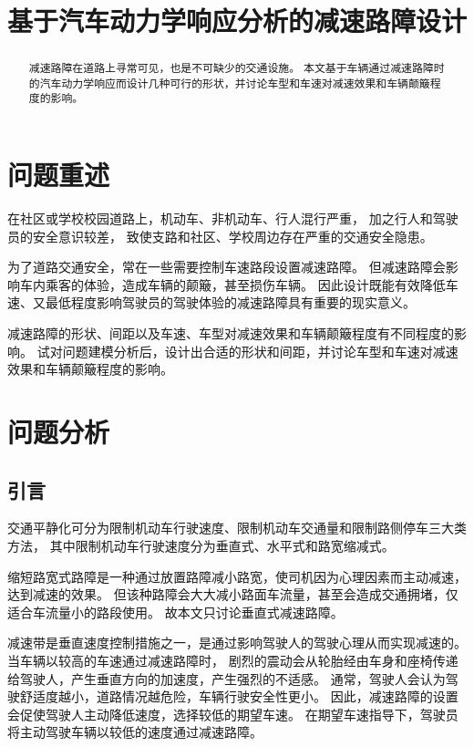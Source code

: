 \documentclass[withoutpreface,bwprint]{cumcmthesis}
\title{基于汽车动力学响应分析的减速路障设计}
\begin{document}
\maketitle
\begin{abstract}

减速路障在道路上寻常可见，也是不可缺少的交通设施。
本文基于车辆通过减速路障时的汽车动力学响应而设计几种可行的形状，并讨论车型和车速对减速效果和车辆颠簸程度的影响。

\end{abstract}

\section{问题重述}

在社区或学校校园道路上，机动车、非机动车、行人混行严重，
加之行人和驾驶员的安全意识较差，
致使支路和社区、学校周边存在严重的交通安全隐患。

为了道路交通安全，常在一些需要控制车速路段设置减速路障。
但减速路障会影响车内乘客的体验，造成车辆的颠簸，甚至损伤车辆。
因此设计既能有效降低车速、又最低程度影响驾驶员的驾驶体验的减速路障具有重要的现实意义。

减速路障的形状、间距以及车速、车型对减速效果和车辆颠簸程度有不同程度的影响。
试对问题建模分析后，设计出合适的形状和间距，并讨论车型和车速对减速效果和车辆颠簸程度的影响。

\section{问题分析}

\subsection{引言}


交通平静化可分为限制机动车行驶速度、限制机动车交通量和限制路侧停车三大类方法，
其中限制机动车行驶速度分为垂直式、水平式和路宽缩减式。

缩短路宽式路障是一种通过放置路障减小路宽，使司机因为心理因素而主动减速，达到减速的效果。
但该种路障会大大减小路面车流量，甚至会造成交通拥堵，仅适合车流量小的路段使用。
故本文只讨论垂直式减速路障。

减速带是垂直速度控制措施之一，是通过影响驾驶人的驾驶心理从而实现减速的。当车辆以较高的车速通过减速路障时，
剧烈的震动会从轮胎经由车身和座椅传递给驾驶人，产生垂直方向的加速度，产生强烈的不适感。
通常，驾驶人会认为驾驶舒适度越小，道路情况越危险，车辆行驶安全性更小。
因此，减速路障的设置会促使驾驶人主动降低速度，选择较低的期望车速。
在期望车速指导下，驾驶员将主动驾驶车辆以较低的速度通过减速路障。
\end{document}
